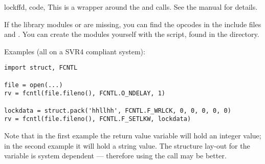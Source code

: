 \begin{funcdesc}{lockf}{fd, code, }
This is a wrapper around the  and
  calls.  See the \UNIX{}
manual for details.
\end{funcdesc}

If the library modules  or
 are missing, you can find the
opcodes in the \C{} include files  and
.  You can create the modules yourself with the
 script, found in the  directory.


Examples (all on a SVR4 compliant system):

\begin{verbatim}
import struct, FCNTL

file = open(...)
rv = fcntl(file.fileno(), FCNTL.O_NDELAY, 1)

lockdata = struct.pack('hhllhh', FCNTL.F_WRLCK, 0, 0, 0, 0, 0)
rv = fcntl(file.fileno(), FCNTL.F_SETLKW, lockdata)
\end{verbatim}

Note that in the first example the return value variable  will
hold an integer value; in the second example it will hold a string
value.  The structure lay-out for the  variable is
system dependent --- therefore using the  call may be
better.
